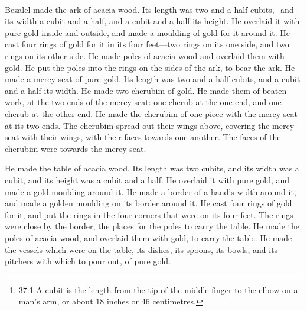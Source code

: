  Bezalel made the ark of acacia wood. Its length was two and
a half cubits,\footnote{37:1 A cubit is the length from the tip of the
  middle finger to the elbow on a man's arm, or about 18 inches or 46
  centimetres.} and its width a cubit and a half, and a cubit and a half
its height.  He overlaid it with pure gold inside and
outside, and made a moulding of gold for it around it.  He
cast four rings of gold for it in its four feet---two rings on its one
side, and two rings on its other side.  He made poles of
acacia wood and overlaid them with gold.  He put the poles
into the rings on the sides of the ark, to bear the ark.  He
made a mercy seat of pure gold. Its length was two and a half cubits,
and a cubit and a half its width.  He made two cherubim of
gold. He made them of beaten work, at the two ends of the mercy seat:
 one cherub at the one end, and one cherub at the other end.
He made the cherubim of one piece with the mercy seat at its two ends.
 The cherubim spread out their wings above, covering the
mercy seat with their wings, with their faces towards one another. The
faces of the cherubim were towards the mercy seat.

 He made the table of acacia wood. Its length was two
cubits, and its width was a cubit, and its height was a cubit and a
half.  He overlaid it with pure gold, and made a gold
moulding around it.  He made a border of a hand's width
around it, and made a golden moulding on its border around it.
 He cast four rings of gold for it, and put the rings in
the four corners that were on its four feet.  The rings
were close by the border, the places for the poles to carry the table.
 He made the poles of acacia wood, and overlaid them with
gold, to carry the table.  He made the vessels which were
on the table, its dishes, its spoons, its bowls, and its pitchers with
which to pour out, of pure gold.

